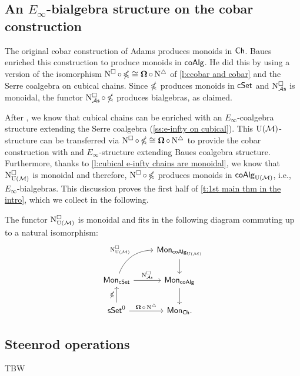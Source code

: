 \subsection{An $E_{\infty}$-bialgebra structure on the cobar construction} \label{ss:e-infty on cobar}

The original cobar construction of Adams produces monoids in $\mathsf{Ch}$.
Baues enriched this construction to produce monoids in $\mathsf{coAlg}$.
He did this by using a version of the isomorphism $\operatorname{N^{\square}} \circ \operatorname{\mathbb{\Omega}} \cong \operatorname{\mathbf{\Omega}} \circ \operatorname{N^{\triangle}}$ of \cref{l:ccobar and cobar} and the Serre coalgebra on cubical chains.
Since $\operatorname{\mathbb{\Omega}}$ produces monoids in $\mathsf{cSet}$ and $\operatorname{N^{\square}_{{\mathcal{A}\mathsf{s}}}}$ is monoidal, the functor $\operatorname{N^{\square}_{{\mathcal{A}\mathsf{s}}}} \circ \operatorname{\mathbb{\Omega}}$ produces bialgebras, as claimed.

After \cite{medina2021cubical}, we know that cubical chains can be enriched with an $E_\infty$-coalgebra structure extending the Serre coalgebra (\cref{ss:e-infty on cubical}).
This ${\operatorname{U}(\mathcal{M})}$-structure can be transferred via $\operatorname{N^{\square}} \circ \operatorname{\mathbb{\Omega}} \cong \operatorname{\mathbf{\Omega}} \circ \operatorname{N^{\triangle}}$ to provide the cobar construction with and $E_\infty$-structure extending Baues coalgebra structure.
Furthermore, thanks to \cref{l:cubical e-infty chains are monoidal}, we know that $\operatorname{N^{\square}_{{\operatorname{U}(\mathcal{M})}}}$ is monoidal and therefore, $\operatorname{N^{\square}} \circ \operatorname{\mathbb{\Omega}}$ produces monoids in $\mathsf{coAlg}_{{\operatorname{U}(\mathcal{M})}}$, i.e., $E_\infty$-bialgebras.
This discussion proves the first half of \cref{t:1st main thm in the intro}, which we collect in the following.

\begin{lemma}
	The functor $\operatorname{N^{\square}_{{\operatorname{U}(\mathcal{M})}}}$ is monoidal and fits in the following diagram commuting up to a natural isomorphism:
	\begin{equation*}
	\begin{tikzcd}
	& \Mon_{\coAlg_\UM} \arrow[d] \\
	\Mon_{\cSet} \arrow[ru, "\cchainsUM", out=70, in=180] \arrow[r, "\cchainsAS"]
	& \Mon_{\coAlg} \arrow[d] \\
	\sSet^0 \arrow[r, "\cobar \circ \schains"] \arrow[u, "\ccobar"]
	& \Mon_{\Ch}.
	\end{tikzcd}
	\end{equation*}	
\end{lemma}

\subsection{Steenrod operations}

TBW

